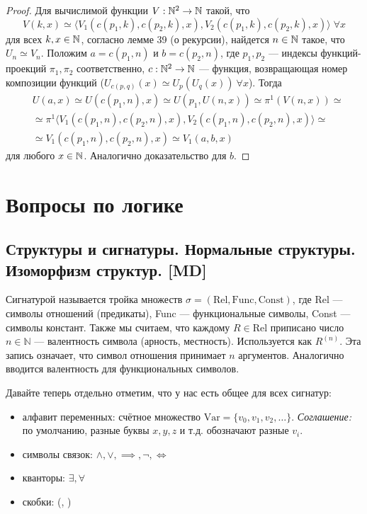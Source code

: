 \documentclass[a4paper, fleqn]{article}
\begin{document}
        \begin{proof}
            Для вычислимой функции $V : \mathbb{N}^2 \to \mathbb{N}$ такой, что\\[-10 pt]
\[ V(k, x) \simeq \langle  V_1(c(p_1, k), c(p_2, k), x), V_2(c(p_1, k), c(p_2, k), x) \rangle \; \forall x \]
для всех $k, x \in \mathbb{N}$, согласно лемме 39 (о рекурсии), найдется $n \in \mathbb{N}$ такое, что $U_n \simeq V_n$. Положим $a = c(p_1, n)$ и $b = c(p_2, n)$, где $p_1, p_2$ --- индексы функций-проекций $\pi_1, \pi_2$ соответственно, $c : \mathbb{N}^2 \to \mathbb{N}$ --- функция, возвращающая номер композиции функций ($U_{c(p,q)}(x) \simeq U_{p}(U_q(x))\: \forall x$). Тогда
            \begin{align*}
                & U(a, x) \simeq U(c(p_1, n), x) \simeq U(p_1, U(n, x)) \simeq \pi^1(V(n, x)) \simeq \\
                & \simeq \pi^1 \langle V_1(c(p_1, n), c(p_2, n), x), V_2(c(p_1, n), c(p_2, n), x) \rangle \simeq \\
                & \simeq V_1(c(p_1, n), c(p_2, n), x) \simeq V_1(a, b, x)
            \end{align*}
            для любого $x \in \mathbb{N}$. Аналогично доказательство для $b$.
        \end{proof}


\section{Вопросы по логике}

    \subsection{Структуры и сигнатуры. Нормальные структуры. Изоморфизм структур. [MD]}
    \begin{definition}
        Сигнатурой называется тройка множеств $\sigma = (\text{Rel}, \text{Func}, \text{Const})$,
        где Rel --- символы отношений (предикаты), Func --- функциональные символы,
        Const --- символы констант. Также мы считаем, что каждому $R \in \text{Rel}$
        приписано число $n \in \mathbb{N}$ --- валентность символа (арность, местность).
        Используется как $R^{(n)}$. Эта запись означает, что символ отношения
        принимает $n$ аргументов. Аналогично вводится валентность для функциональных символов.
    \end{definition}

    Давайте теперь отдельно отметим, что у нас есть общее для всех сигнатур:
    \begin{itemize}
        \item алфавит переменных: счётное множество $\text{Var} = \{v_0, v_1, v_2, \dots\}$.
        \textit{Соглашение:} по умолчанию, разные буквы $x, y, z$ и т.д. 
        обозначают разные $v_i$.
        \item символы связок: $\land, \lor, \implies, \neg, \iff$
        \item кванторы: $\exists, \forall$
        \item скобки: (, )
    \end{itemize}
\end{document}
